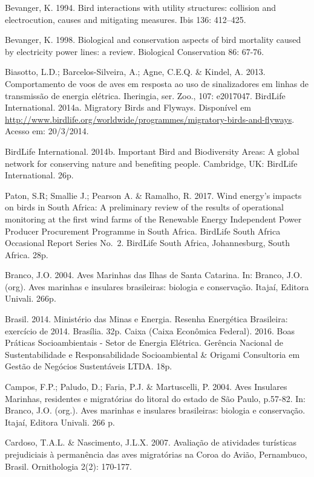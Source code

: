 \documentclass[
]{scrbook}
\begin{document}
Bevanger, K. 1994. Bird interactions with utility structures: collision and electrocution, causes and mitigating measures. Ibis 136: 412--425.

Bevanger, K. 1998. Biological and conservation aspects of bird mortality caused by electricity power lines: a review. Biological Conservation 86: 67-76.

Biasotto, L.D.; Barcelos-Silveira, A.; Agne, C.E.Q. \& Kindel, A. 2013. Comportamento de voos de aves em resposta ao uso de sinalizadores em linhas de transmissão de energia elétrica. Iheringia, ser. Zoo., 107: e2017047.
BirdLife International. 2014a. Migratory Birds and Flyways. Disponível em \url{http://www.birdlife.org/worldwide/programmes/migratory-birds-and-flyways}. Acesso em: 20/3/2014.

BirdLife International. 2014b. Important Bird and Biodiversity Areas: A global network for conserving nature and benefiting people. Cambridge, UK: BirdLife International. 26p.

Paton, S.R; Smallie J.; Pearson A. \& Ramalho, R. 2017. Wind energy's impacts on birds in South Africa: A preliminary review of the results of operational monitoring at the first wind farms of the Renewable Energy Independent Power Producer Procurement Programme in South Africa. BirdLife South Africa Occasional Report Series No.~2. BirdLife South Africa, Johannesburg, South Africa. 28p.

Branco, J.O. 2004. Aves Marinhas das Ilhas de Santa Catarina. In: Branco, J.O. (org). Aves marinhas e insulares brasileiras: biologia e conservação. Itajaí, Editora Univali. 266p.

Brasil. 2014. Ministério das Minas e Energia. Resenha Energética Brasileira: exercício de 2014. Brasília. 32p.
Caixa (Caixa Econômica Federal). 2016. Boas Práticas Socioambientais - Setor de Energia Elétrica. Gerência Nacional de Sustentabilidade e Responsabilidade Socioambiental \& Origami Consultoria em Gestão de Negócios Sustentáveis LTDA. 18p.

Campos, F.P.; Paludo, D.; Faria, P.J. \& Martuscelli, P. 2004. Aves Insulares Marinhas, residentes e migratórias do litoral do estado de São Paulo, p.57-82. In: Branco, J.O. (org.). Aves marinhas e insulares brasileiras: biologia e conservação. Itajaí, Editora Univali. 266 p.~

Cardoso, T.A.L. \& Nascimento, J.L.X. 2007. Avaliação de atividades turísticas prejudiciais à permanência das aves migratórias na Coroa do Avião, Pernambuco, Brasil. Ornithologia 2(2): 170-177.
\end{document}
